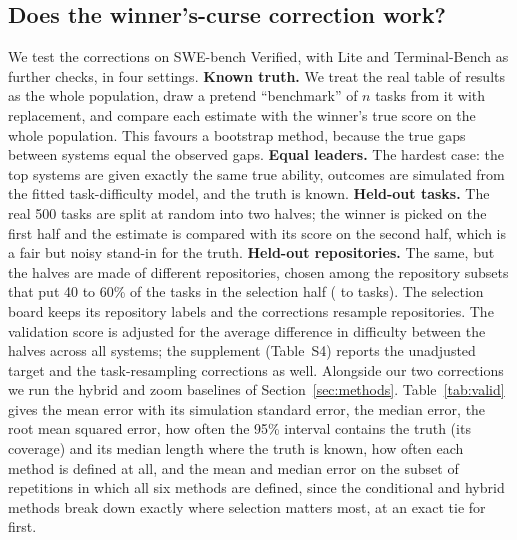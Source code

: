 \documentclass[11pt]{article}
\begin{document}
\subsection{Does the winner's-curse correction work?}
We test the corrections on SWE-bench Verified, with Lite and Terminal-Bench as further checks, in four settings.
\textbf{Known truth.} We treat the real table of results as the whole population, draw a pretend ``benchmark'' of $n$ tasks from it with replacement, and compare each estimate with the winner's true score on the whole population. This favours a bootstrap method, because the true gaps between systems equal the observed gaps.
\textbf{Equal leaders.} The hardest case: the top \NumBunchEqualTop{} systems are given exactly the same true ability, outcomes are simulated from the fitted task-difficulty model, and the truth is known.
\textbf{Held-out tasks.} The real 500 tasks are split at random into two halves; the winner is picked on the first half and the estimate is compared with its score on the second half, which is a fair but noisy stand-in for the truth.
\textbf{Held-out repositories.} The same, but the halves are made of different repositories, chosen among the \NumVThreeSplits{} repository subsets that put 40 to 60\% of the tasks in the selection half (\NumVThreeSelMin{} to \NumVThreeSelMax{} tasks). The selection board keeps its repository labels and the corrections resample repositories. The validation score is adjusted for the average difference in difficulty between the halves across all systems; the supplement (Table~S4) reports the unadjusted target and the task-resampling corrections as well.
Alongside our two corrections we run the hybrid and zoom baselines of Section~\ref{sec:methods}.
Table~\ref{tab:valid} gives the mean error with its simulation standard error, the median error, the root mean squared error, how often the 95\% interval contains the truth (its coverage) and its median length where the truth is known, how often each method is defined at all, and the mean and median error on the subset of repetitions in which all six methods are defined, since the conditional and hybrid methods break down exactly where selection matters most, at an exact tie for first.

\begin{table}[t]
\centering\scriptsize
\resizebox{\textwidth}{!}{}
\caption{Winner's-curse correction on SWE-bench Verified, at least \NumValR{} repetitions per setting. Error is estimate minus target in percentage points; positive means overstated. Coverage is shown only where the truth is known; length is the median length of the 95\% interval in points. The zoom interval's point estimate is the reported score. The last two columns use the repetitions in which all six estimators are defined.}
\label{tab:valid}
\end{table}
\end{document}
